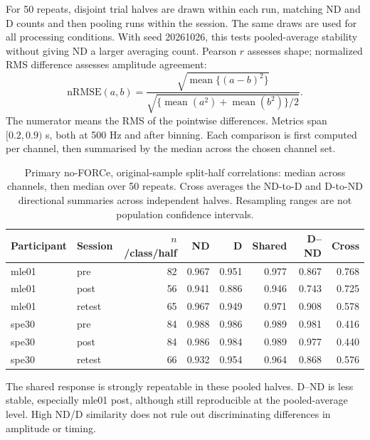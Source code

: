 \documentclass[11pt,a4paper]{article}
\begin{document}
For 50 repeats, disjoint trial halves are drawn within each run, matching ND and D counts and then pooling runs within the session. The same draws are used for all processing conditions. With seed 20261026, this tests pooled-average stability without giving ND a larger averaging count. Pearson $r$ assesses shape; normalized RMS difference assesses amplitude agreement:
\[
\mathrm{nRMSE}(a,b)=\frac{\sqrt{\operatorname{mean}\{(a-b)^2\}}}{\sqrt{\{\operatorname{mean}(a^2)+\operatorname{mean}(b^2)\}/2}}.
\]
The numerator means the RMS of the pointwise differences. Metrics span $[0.2,0.9)$ s, both at 500 Hz and after binning. Each comparison is first computed per channel, then summarised by the median across the chosen channel set.
\begin{table}[H]\centering\small
\begin{tabular}{@{}llrrrrrr@{}}\toprule
Participant & Session & $n$/class/half & ND & D & Shared & D--ND & Cross\\\midrule
mle01 & pre & 82 & 0.967 & 0.951 & 0.977 & 0.867 & 0.768 \\
mle01 & post & 56 & 0.941 & 0.886 & 0.946 & 0.743 & 0.725 \\
mle01 & retest & 65 & 0.967 & 0.949 & 0.971 & 0.908 & 0.578 \\
spe30 & pre & 84 & 0.988 & 0.986 & 0.989 & 0.981 & 0.416 \\
spe30 & post & 84 & 0.986 & 0.984 & 0.989 & 0.977 & 0.440 \\
spe30 & retest & 66 & 0.932 & 0.954 & 0.964 & 0.868 & 0.576 \\
\bottomrule\end{tabular}
\caption{Primary no-FORCe, original-sample split-half correlations: median across channels, then median over 50 repeats. Cross averages the ND-to-D and D-to-ND directional summaries across independent halves. Resampling ranges are not population confidence intervals.}\label{tab:half}
\end{table}
The shared response is strongly repeatable in these pooled halves. D--ND is less stable, especially mle01 post, although still reproducible at the pooled-average level. High ND/D similarity does not rule out discriminating differences in amplitude or timing.
\end{document}
